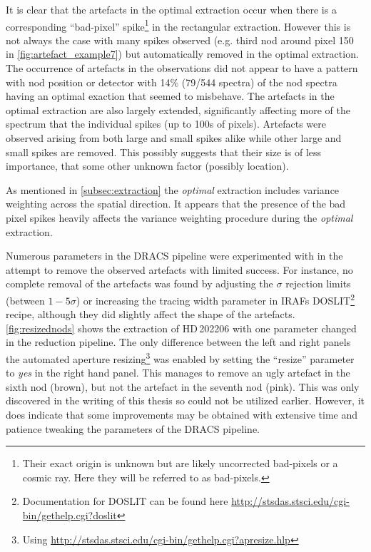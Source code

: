 It is clear that the artefacts in the optimal extraction occur when there is a corresponding ``bad-pixel'' spike\footnote{Their exact origin is unknown but are likely uncorrected bad-pixels or a cosmic ray.
Here they will be referred to as bad-pixels.} in the rectangular extraction.
However this is not always the case with many spikes observed (e.g. third nod around pixel 150 in \cref{fig:artefact_example7}) but automatically removed in the optimal extraction.
The occurrence of artefacts in the observations did not appear to have a pattern with nod position or detector with 14\% (79/544 spectra) of the nod spectra having an optimal exaction that seemed to misbehave.
The artefacts in the optimal extraction are also largely extended, significantly affecting more of the spectrum that the individual spikes (up to 100s of pixels).
Artefacts were observed arising from both large and small spikes alike while other large and small spikes are removed.
This possibly suggests that their size is of less importance, that some other unknown factor (possibly location).

As mentioned in \cref{subsec:extraction} the \emph{optimal} extraction includes variance weighting across the spatial direction.
It appears that the presence of the bad pixel spikes heavily affects the variance weighting procedure during the \emph{optimal} extraction.

Numerous parameters in the {DRACS} pipeline were experimented with in the attempt to remove the observed artefacts with limited success.
For instance, no complete removal of the artefacts was found by adjusting the \(\sigma\) rejection limits (between \(1-5 \sigma\)) or  increasing the tracing width parameter in {IRAF}s DOSLIT\footnote{Documentation for DOSLIT can be found here \href{http://stsdas.stsci.edu/cgi-bin/gethelp.cgi?doslit}{http://stsdas.stsci.edu/cgi-bin/gethelp.cgi?doslit}} recipe, although they did slightly affect the shape of the artefacts.
\cref{fig:resizednods} shows the extraction of HD\,202206 with one parameter changed in the reduction pipeline.
The only difference between the left and right panels the automated aperture resizing\footnote{Using \href{apresize}{http://stsdas.stsci.edu/cgi-bin/gethelp.cgi?apresize.hlp}} was enabled by setting the ``resize'' parameter to \emph{yes} in the right hand panel.
This manages to remove an ugly artefact in the sixth nod (brown), but not the artefact in the seventh nod (pink).
This was only discovered in the writing of this thesis so could not be utilized earlier.
However, it does indicate that some improvements may be obtained with extensive time and patience tweaking the parameters of the {DRACS} pipeline.

